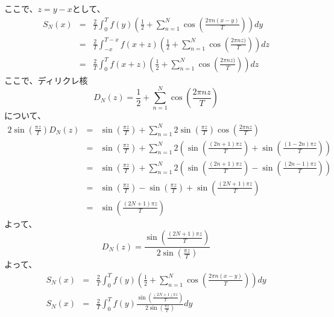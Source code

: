 \documentclass[a4paper]{jsarticle}
\begin{document}
ここで、$ z = y - x $として、
\begin{eqnarray}
	S_N \left( x \right) & = & \frac { 2 } { T } \int _0 ^T f \left( y \right) \left( \frac { 1 } { 2 } + \sum _{ n = 1 } ^N \cos \left( \frac { 2 \pi n \left( x - y \right) } { T } \right) \right) dy \nonumber \\
	& = & \frac { 2 } { T } \int _{ -x } ^{ T - x } f \left( x + z \right) \left( \frac { 1 } { 2 } + \sum _{ n = 1 } ^N \cos \left( \frac { 2 \pi nz ) } { T } \right) \right) dz \nonumber \\
	& = & \frac { 2 } { T } \int _0 ^T f \left( x + z \right) \left( \frac { 1 } { 2 } + \sum _{ n = 1 } ^N \cos \left( \frac { 2 \pi nz ) } { T } \right) \right) dz
\end{eqnarray}
ここで、ディリクレ核
\begin{equation}
D_N \left( z \right) = \frac { 1 } { 2 } + \sum _{ n = 1 } ^N \cos \left( \frac { 2 \pi nz } { T } \right)
\end{equation}
について、
\begin{eqnarray}
	2 \sin \left( \frac { \pi z } { T } \right) D_N \left( z \right) & = & \sin \left( \frac { \pi z } { T } \right) + \sum _{ n = 1 } ^N 2 \sin \left( \frac { \pi z } { T } \right) \cos \left( \frac { 2 \pi nz } { T } \right) \nonumber \\
	& = & \sin \left( \frac { \pi z } { T } \right) + \sum _{ n = 1 } ^N 2 \left( \sin \left( \frac { \left( 2n + 1 \right) \pi z } { T } \right) + \sin \left( \frac { \left( 1 - 2n \right) \pi z } { T } \right) \right) \nonumber \\
	& = & \sin \left( \frac { \pi z } { T } \right) + \sum _{ n = 1 } ^N 2 \left( \sin \left( \frac { \left( 2n + 1 \right) \pi z } { T } \right) - \sin \left( \frac { \left( 2n - 1 \right) \pi z } { T } \right) \right) \nonumber \\
	& = & \sin \left( \frac { \pi z } { T } \right) - \sin \left( \frac { \pi z } { T } \right) + \sin \left( \frac { \left( 2N + 1 \right) \pi z } { T } \right) \nonumber \\
	& = & \sin \left( \frac { \left( 2N + 1 \right) \pi z } { T } \right) 
\end{eqnarray}
よって、
\begin{equation}
D_N \left( z \right) = \frac { \sin \left( \frac { \left( 2N + 1 \right) \pi z } { T } \right) } { 2 \sin \left( \frac { \pi z } { T } \right) }
\end{equation}
よって、
\begin{eqnarray}
	S_N \left( x \right) & = & \frac { 2 } { T } \int _0 ^T f \left( y \right) \left( \frac { 1 } { 2 } + \sum _{ n = 1 } ^N \cos \left( \frac { 2 \pi n \left( x - y \right) } { T } \right) \right) dy \nonumber \\
	S_N \left( x \right) & = & \frac { 2 } { T } \int _0 ^T f \left( y \right) \frac { \sin \left( \frac { \left( 2N + 1 \right) \pi z } { T } \right) } { 2 \sin \left( \frac { \pi z } { T } \right) }
dy
\end{eqnarray}
\end{document}
